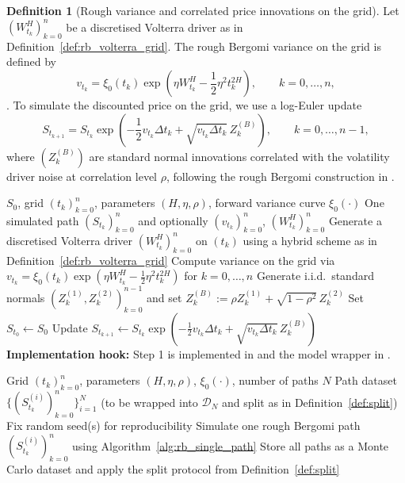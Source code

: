 \documentclass[12pt,a4paper]{article}
\theoremstyle{definition}
\newtheorem{definition}{Definition}[section]
\theoremstyle{plain}
\theoremstyle{remark}
\theoremstyle{plain}
\begin{document}
\begin{definition}[Rough variance and correlated price innovations on the grid]
\label{def:rb_variance_price_grid}
Let $(W^H_{t_k})_{k=0}^n$ be a discretised Volterra driver as in Definition~\ref{def:rb_volterra_grid}.
The rough Bergomi variance on the grid is defined by
\[
v_{t_k}
=
\xi_0(t_k)\exp\!\left(\eta W^H_{t_k}-\frac12\eta^2 t_k^{2H}\right),
\qquad k=0,\dots,n,
\]
\cite{BayerFriz2016}.
To simulate the discounted price on the grid, we use a log-Euler update
\[
S_{t_{k+1}}
=
S_{t_k}\exp\!\left(-\frac12 v_{t_k}\Delta t_k+\sqrt{v_{t_k}\Delta t_k}\,Z_k^{(B)}\right),
\qquad k=0,\dots,n-1,
\]
where $(Z_k^{(B)})$ are standard normal innovations correlated with the volatility driver noise at correlation level $\rho$, following the rough Bergomi construction in \cite{BayerFriz2016}.
\end{definition}

\begin{algorithm}[H]
\caption{Simulating one rough Bergomi path on a grid (hybrid driver)}
\label{alg:rb_single_path}
\begin{algorithmic}[1]
\Require $S_0$, grid $(t_k)_{k=0}^n$, parameters $(H,\eta,\rho)$, forward variance curve $\xi_0(\cdot)$
\Ensure One simulated path $(S_{t_k})_{k=0}^n$ and optionally $(v_{t_k})_{k=0}^n$, $(W^H_{t_k})_{k=0}^n$
\State Generate a discretised Volterra driver $(W^H_{t_k})_{k=0}^n$ on $(t_k)$ using a hybrid scheme as in Definition~\ref{def:rb_volterra_grid}
\State Compute variance on the grid via $v_{t_k}=\xi_0(t_k)\exp(\eta W^H_{t_k}-\tfrac12\eta^2 t_k^{2H})$ for $k=0,\dots,n$
\State Generate i.i.d.\ standard normals $(Z_k^{(1)},Z_k^{(2)})_{k=0}^{n-1}$ and set $Z_k^{(B)}:=\rho Z_k^{(1)}+\sqrt{1-\rho^2}\,Z_k^{(2)}$
\State Set $S_{t_0}\gets S_0$
    \State Update $S_{t_{k+1}}\gets S_{t_k}\exp(-\tfrac12 v_{t_k}\Delta t_k+\sqrt{v_{t_k}\Delta t_k}\,Z_k^{(B)})$
\EndFor
\Statex \textbf{Implementation hook:} Step 1 is implemented in  and the model wrapper in .
\end{algorithmic}
\end{algorithm}

\begin{algorithm}[H]
\caption{Vectorised rough Bergomi dataset generation (paths only)}
\label{alg:rb_dataset_generation}
\begin{algorithmic}[1]
\Require Grid $(t_k)_{k=0}^n$, parameters $(H,\eta,\rho)$, $\xi_0(\cdot)$, number of paths $N$
\Ensure Path dataset $\{(S^{(i)}_{t_k})_{k=0}^n\}_{i=1}^N$ (to be wrapped into $\mathcal{D}_N$ and split as in Definition~\ref{def:split})
\State Fix random seed(s) for reproducibility
    \State Simulate one rough Bergomi path $(S^{(i)}_{t_k})_{k=0}^n$ using Algorithm~\ref{alg:rb_single_path}
\EndFor
\State Store all paths as a Monte Carlo dataset and apply the split protocol from Definition~\ref{def:split}
\end{algorithmic}
\end{algorithm}
\end{document}
